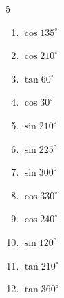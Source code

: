 \begin{multicols}{5}
\begin{enumerate}
\columnbreak %

  \item $\displaystyle \cos{135^\circ}$


  \item $\displaystyle \cos{210^\circ}$


  \item $\displaystyle \tan{60^\circ}$


  \item $\displaystyle \cos{30^\circ}$


  \item $\displaystyle \sin{210^\circ}$


  \item $\displaystyle \sin{225^\circ}$


  \item $\displaystyle \sin{300^\circ}$


  \item $\displaystyle \cos{330^\circ}$


  \item $\displaystyle \cos{240^\circ}$


  \item $\displaystyle \sin{120^\circ}$


  \item $\displaystyle \tan{210^\circ}$


  \item $\displaystyle \tan{360^\circ}$

        \phantom{$\displaystyle =0$}


\end{enumerate}
\end{multicols}
